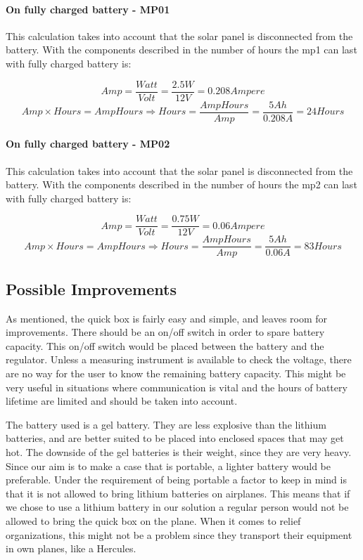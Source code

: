 \paragraph{On fully charged battery - MP01}
This calculation takes into account that the solar panel is disconnected from the battery. With the components described in  the number of hours the \gls{mp1} can last with fully charged battery is: 

$$Amp = \frac{Watt}{Volt} = \frac{2.5 W}{12 V} = 0.208 Ampere$$
$$Amp\times Hours = AmpHours \Rightarrow Hours = \frac{AmpHours}{Amp} = \frac{5 Ah}{0.208 A} = 24 Hours$$

\paragraph{On fully charged battery - MP02}
This calculation takes into account that the solar panel is disconnected from the battery. With the components described in  the number of hours the \gls{mp2} can last with fully charged battery is: 

$$Amp = \frac{Watt}{Volt} = \frac{0.75 W}{12 V} = 0.06 Ampere$$
$$Amp\times Hours = AmpHours \Rightarrow Hours = \frac{AmpHours}{Amp} = \frac{5 Ah}{0.06 A} = 83 Hours$$


\subsection{Possible Improvements}
As mentioned, the \gls {quick} box is fairly easy and simple, and leaves room for improvements. There should be an on/off switch in order to spare battery capacity. This on/off switch would be placed between the battery and the regulator. Unless a measuring instrument is available to check the voltage, there are no way for the user to know the remaining battery capacity. This might be very useful in situations where communication is vital and the hours of battery lifetime are limited and should be taken into account. 

The battery used is a gel battery. They are less explosive than the lithium batteries, and are better suited to be placed into enclosed spaces that may get hot. The downside of the gel batteries is their weight, since they are very heavy. Since our aim is to make a case that is portable, a lighter battery would be preferable. Under the requirement of being portable a factor to keep in mind is that it is not allowed to bring lithium batteries on airplanes. This means that if we chose to use a lithium battery in our solution a regular person would not be allowed to bring the \gls{quick} box on the plane. When it comes to relief organizations, this might not be a problem since they transport their equipment in own planes, like a Hercules. 

